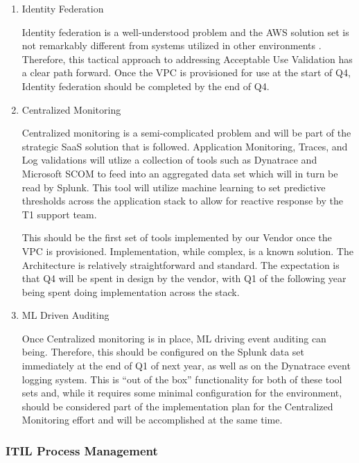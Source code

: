 \documentclass[stu]{apa7}
\begin{document}
\begin{enumerate}
\item Identity Federation
\label{sec:orgf6bdb84}

Identity federation is a well-understood problem and the AWS solution set is not remarkably different from systems utilized in other environments \citep{awsFederationAmazonWeb}. Therefore, this tactical approach to addressing Acceptable Use Validation has a clear path forward. Once the VPC is provisioned for use at the start of Q4, Identity federation should be completed by the end of Q4.

\item Centralized Monitoring
\label{sec:org63be387}

Centralized monitoring is a semi-complicated problem and will be part of the strategic SaaS solution that is followed. Application Monitoring, Traces, and Log validations will utlize a collection of tools such as Dynatrace and Microsoft SCOM to feed into an aggregated data set which will in turn be read by Splunk. This tool will utilize machine learning to set predictive thresholds across the application stack to allow for reactive response by the T1 support team.

This should be the first set of tools implemented by our Vendor once the VPC is provisioned. Implementation, while complex, is a known solution. The Architecture is relatively straightforward and standard. The expectation is that Q4 will be spent in design by the vendor, with Q1 of the following year being spent doing implementation across the stack.

\item ML Driven Auditing
\label{sec:org29db96d}

Once Centralized monitoring is in place, ML driving event auditing can being. Therefore, this should be configured on the Splunk data set immediately at the end of Q1 of next year, as well as on the Dynatrace event logging system. This is ``out of the box'' functionality for both of these tool sets and, while it requires some minimal configuration for the environment, should be considered part of the implementation plan for the Centralized Monitoring effort and will be accomplished at the same time.
\end{enumerate}

\subsubsection{ITIL Process Management}
\label{sec:orgbc2edd6}
\end{document}
